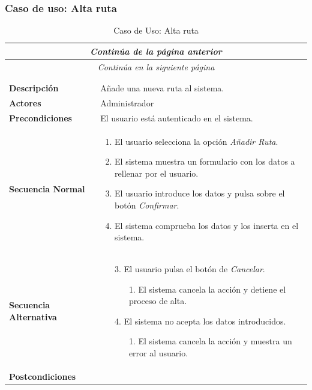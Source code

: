 \subsubsection*{Caso de uso: Alta ruta }
\begin{longtable}{| p{4cm} | p{10cm} |}
\endfirsthead
\multicolumn{2}{c}{\textit{Continúa de la página anterior}}\\[12pt]
\hline
\endhead
\hline
\multicolumn{2}{c}{\textit{Continúa en la siguiente página}} \\
\endfoot
\hline
\caption{Caso de Uso: Alta ruta}\label{fig:1}\\
\endlastfoot


\hline
\multicolumn{2}{|c|}{\textbf{CU$<$27$>$ - Alta Ruta}} \\

\hline
\textbf{Descripción} &
Añade una nueva ruta al sistema.\\

\hline
\textbf{Actores} &
Administrador\\

\hline
\textbf{Precondiciones} &
El usuario está autenticado en el sistema.\\

\hline
\textbf{Secuencia Normal} &\mbox{}\par\vspace{-\baselineskip}
\begin{enumerate}[leftmargin=0.7cm, topsep=0.1cm]
\item El usuario selecciona la opción \textit{Añadir Ruta}.
\item El sistema muestra un formulario con los datos a rellenar por el usuario.
\item El usuario introduce los datos y pulsa sobre el botón \textit{Confirmar}.
\item El sistema comprueba los datos y los inserta en el sistema.
\end{enumerate}


\\
\hline
\textbf{Secuencia Alternativa} &\mbox{}\par\vspace{-\baselineskip}
\begin{enumerate}[leftmargin=0.9cm, topsep=0.1cm]
\item[3.] El usuario pulsa el botón de \textit{Cancelar}.
	\begin{itemize}
	\item[1.] El sistema cancela la acción y detiene el proceso de alta.
	\end{itemize}
\item[4.] El sistema no acepta los datos introducidos.
	\begin{itemize}
	\item[1.] El sistema cancela la acción y muestra un error al usuario.
	\end{itemize}
\end{enumerate}
\\

\hline
\textbf{Postcondiciones} & \\
\hline
\end{longtable}



